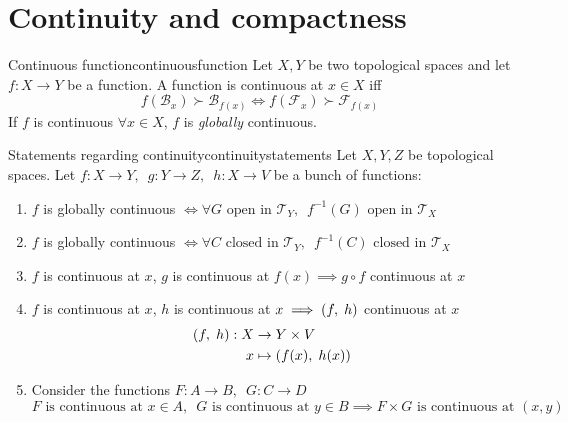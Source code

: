 \section{Continuity and compactness}\label{sec:contcomp}
\begin{mydef}{Continuous function}{continuousfunction}
	Let $X, Y$ be two topological spaces and let $ f : X \to Y $ be a function. A function is continuous at $x \in X$ iff
	$$ f ( \mathcal{B}_x ) \succ  \mathcal{B}_{f(x)} \iff f ( \mathcal{F}_x ) \succ  \mathcal{F}_{f(x)} $$ 
	If $f$ is continuous $\forall x \in X$, $f$ is \textit{globally} continuous. 
\end{mydef}
\begin{myprop}{Statements regarding continuity}{continuitystatements}
	Let $X, Y, Z$ be topological spaces. Let $f : X \to Y, \enspace g : Y \to Z, \enspace h : X \to V$ be a bunch of functions: 
	\begin{enumerate}[label = \roman*.]
		\item $f$ is globally continuous $\iff \forall G \textrm{ open in } \mathcal{T}_Y, \enspace f^{-1} (G) \textrm{ open in } \mathcal{T}_X $
		\item $f$ is globally continuous $\iff \forall C \textrm{ closed in } \mathcal{T}_Y, \enspace f^{-1} (C) \textrm{ closed in } \mathcal{T}_X $
		\item $f$ is continuous at $x$, $g$ is continuous at $f(x) \implies g \circ f$ continuous at $x$
		\item $f$ is continuous at $x$, $h$ is continuous at $x \implies (f,\hspace{1mm} h) $ continuous at $x$
			\begin{align*}
				(f, \hspace{1mm} h) : X &\to Y \times V\\
					 x &\mapsto (f(x), \hspace{1mm} h(x))
			\end{align*}
		\item Consider the functions $F : A \to B, \enspace G : C \to D$
			$$F \textrm{ is continuous at } x\in A, \enspace G \textrm{ is continuous at } y\in B \implies F\times G \textrm{ is continuous at } (x, y)$$
	\end{enumerate}
\end{myprop}
